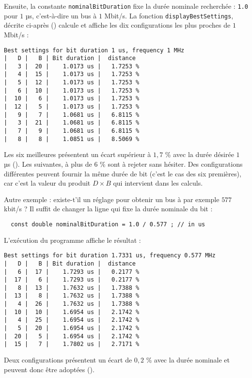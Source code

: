 Ensuite, la constante \texttt{nominalBitDuration} fixe la durée nominale recherchée : \texttt{1.0} pour $1$ µs, c'est-à-dire un bus à $1$ Mbit/s. La fonction \texttt{displayBestSettings}, décrite ci-après () calcule et affiche les dix configurations les plus proches de $1$ Mbit/s :

{\small\singlespacing
\begin{verbatim}
Best settings for bit duration 1 us, frequency 1 MHz
|   D |   B | Bit duration |  distance
|   3 |  20 |    1.0173 us |   1.7253 %
|   4 |  15 |    1.0173 us |   1.7253 %
|   5 |  12 |    1.0173 us |   1.7253 %
|   6 |  10 |    1.0173 us |   1.7253 %
|  10 |   6 |    1.0173 us |   1.7253 %
|  12 |   5 |    1.0173 us |   1.7253 %
|   9 |   7 |    1.0681 us |   6.8115 %
|   3 |  21 |    1.0681 us |   6.8115 %
|   7 |   9 |    1.0681 us |   6.8115 %
|   8 |   8 |    1.0851 us |   8.5069 %
\end{verbatim}
}

Les six meilleures présentent un écart supérieur à $1,7$ \% avec la durée désirée $1$ µs (\pasFini). Les suivantes, à plus de $6$ \% sont à rejeter sans hésiter. Des configurations différentes peuvent fournir la même durée de bit (c'est le cas des six premières), car c'est la valeur du produit $D\times B$ qui intervient dans les calculs. 

Autre exemple : existe-t'il un réglage pour obtenir un bus à par exemple $577$ kbit/s ? Il suffit de changer la ligne qui fixe la durée nominale du bit : 

\begin{lstlisting}
  const double nominalBitDuration = 1.0 / 0.577 ; // in us
\end{lstlisting}

L'exécution du programme affiche le résultat :
{\small\singlespacing
\begin{verbatim}
Best settings for bit duration 1.7331 us, frequency 0.577 MHz
|   D |   B | Bit duration |  distance
|   6 |  17 |    1.7293 us |   0.2177 %
|  17 |   6 |    1.7293 us |   0.2177 %
|   8 |  13 |    1.7632 us |   1.7388 %
|  13 |   8 |    1.7632 us |   1.7388 %
|   4 |  26 |    1.7632 us |   1.7388 %
|  10 |  10 |    1.6954 us |   2.1742 %
|   4 |  25 |    1.6954 us |   2.1742 %
|   5 |  20 |    1.6954 us |   2.1742 %
|  20 |   5 |    1.6954 us |   2.1742 %
|  15 |   7 |    1.7802 us |   2.7171 %
\end{verbatim}
}

Deux configurations présentent un écart de $0,2$ \% avec la durée nominale et peuvent donc être adoptées (\pasFini).








